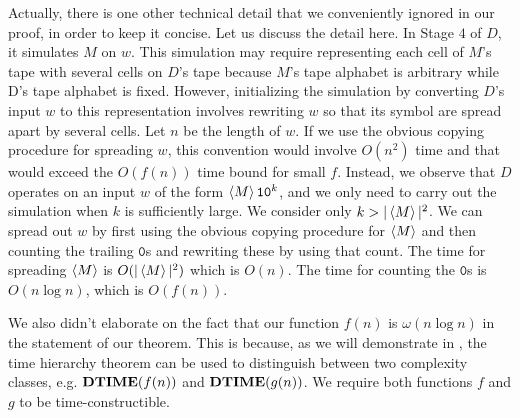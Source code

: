\documentclass[11pt,twoside=off,numbers=noenddot]{scrbook}
\begin{document}
\begin{remark}
  Actually, there is one other technical detail that we conveniently ignored in our proof, in order to keep it concise. Let us discuss the detail here. In Stage $4$ of $D$, it simulates $M$ on $w$. This simulation may require representing each cell of $M$'s tape with several cells on $D$'s tape because $M$'s tape alphabet is arbitrary while D's tape alphabet is fixed. However, initializing the simulation by converting $D$'s input $w$ to this representation involves rewriting $w$ so that its symbol are spread apart by several cells. Let $n$ be the length of $w$. If we use the obvious copying procedure for spreading $w$, this convention would involve $O(n^2)$ time and that would exceed the $O(f(n))$ time bound for small $f$. Instead, we observe that $D$ operates on an input $w$ of the form $\left< M \right>\texttt{1}\texttt{0}^k$, and we only need to carry out the simulation when $k$ is sufficiently large. We consider only $k > | \left< M \right> |^2$. We can spread out $w$ by first using the obvious copying procedure for $\left< M \right>$ and then counting the trailing $\texttt{0}$s and rewriting these by using that count. The time for spreading $\left< M \right>$ is $O(| \left< M \right> |^2)$ which is $O(n)$. The time for counting the $\texttt{0}$s is $O(n \log n)$, which is $O(f(n))$.
\end{remark}

\begin{remark}
  We also didn't elaborate on the fact that our function $f(n)$ is $\omega(n \log n)$ in the statement of our theorem. This is because, as we will demonstrate in , the time hierarchy theorem can be used to distinguish between two complexity classes, e.g. $\textbf{DTIME}(f(n))$ and $\textbf{DTIME}(g(n))$. We require both functions $f$ and $g$ to be time-constructible.
\end{remark}
\end{document}
